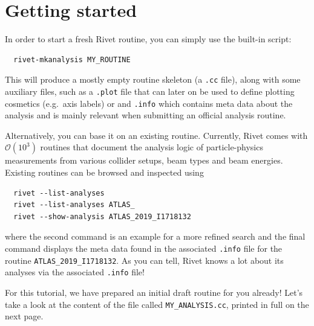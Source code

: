 \documentclass[10pt,fleqn]{scrartcl}
\theoremstyle{exstyle}
\begin{document}
\section{Getting started}

In order to start a fresh Rivet routine, you can simply use the built-in script:
\begin{verbatim}
  rivet-mkanalysis MY_ROUTINE
\end{verbatim}
This will produce a mostly empty routine skeleton (a \texttt{.cc} file),
along with some auxiliary files, such as a \texttt{.plot} file that can 
later on be used to define plotting cosmetics (e.g.\ axis labels) or
and \texttt{.info} which contains meta data about the analysis and
is mainly relevant when submitting an official analysis routine.

Alternatively, you can base it on an existing routine. Currently, Rivet comes
with $\mathcal{O}(10^3)$ routines that document the analysis logic of 
particle-physics measurements from various collider setups, beam types 
and beam energies. Existing routines can be browsed and inspected using 
\begin{verbatim}
  rivet --list-analyses
  rivet --list-analyses ATLAS_
  rivet --show-analysis ATLAS_2019_I1718132
\end{verbatim}
where the second command is an example for a more refined search and
the final command displays the meta data found in the associated 
\texttt{.info} file for the routine \verb|ATLAS_2019_I1718132|.
As you can tell, Rivet knows a lot about its analyses 
via the associated \texttt{.info} file!

For this tutorial, we have prepared an initial draft routine for you already!
Let's take a look at the content of the file called \verb|MY_ANALYSIS.cc|,
printed in full on the next page.
\end{document}
